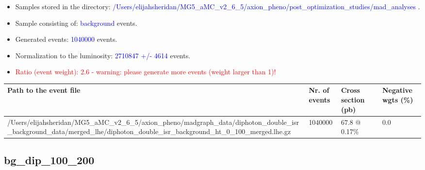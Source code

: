 \documentclass[a4paper, 10pt]{article}
\begin{document}
\begin{itemize}
  \item Samples stored in the directory: \textcolor{blue}{/\-Users/\-elijahsheridan/\-MG5\_aMC\_v2\_6\_5/\-axion\_pheno/\-post\_optimization\_studies/\-mad\_analyses} .
   \item Sample consisting of: \textcolor{blue}{background}  events.
   \item Generated events: \textcolor{blue}{1040000 }  events.
   \item Normalization to the luminosity: \textcolor{blue}{2710847}\textcolor{blue}{ +/\-- }\textcolor{blue}{4614 }  events.
   \item\textcolor{red}{Ratio (event weight): }\textcolor{red}{2.6 }\textcolor{red}{ - warning: please generate more events (weight larger than 1)!}
\textcolor{red}{}
\end{itemize}
\begin{table}[H]
  \begin{center}
    \begin{tabular}{|m{55.0mm}|m{25.0mm}|m{30.0mm}|m{30.0mm}|}
      \hline
      {\cellcolor{yellow}         Path to the event file}& {\cellcolor{yellow}         Nr. of events}& {\cellcolor{yellow}         Cross section (pb)}& {\cellcolor{yellow}         Negative wgts (\%)}\\
      \hline
      {\cellcolor{white}          /\-Users/\-elijahsheridan/\-MG5\_aMC\_v2\_6\_5/\-axion\_pheno/\-madgraph\_data/\-diphoton\_double\_isr\_background\_data/\-merged\_lhe/\-diphoton\_double\_isr\_background\_ht\_0\_100\_merged.lhe.gz}& {\cellcolor{white}          1040000}& {\cellcolor{white}          67.8 @ 0.17\%}& {\cellcolor{white}          0.0}\\
\hline
    \end{tabular}
  \end{center}
\end{table}

\subsection{ bg\_dip\_100\_200}
\end{document}
